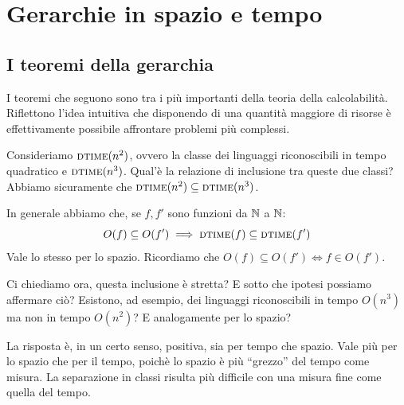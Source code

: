 %
%
%
%
\chapter{Gerarchie in spazio e tempo}


\section{I teoremi della gerarchia}

I teoremi che seguono sono tra i più importanti della teoria della calcolabilità. Riflettono
l'idea intuitiva che disponendo di una quantità maggiore di risorse è effettivamente possibile
affrontare problemi più complessi.

Consideriamo $\textsc{dtime}(n^{2})$, ovvero la classe dei linguaggi riconoscibili in tempo quadratico e
$\textsc{dtime}(n^{3})$. Qual'è la relazione di inclusione tra queste due classi? Abbiamo sicuramente che
$\textsc{dtime}(n^{2}) \subseteq \textsc{dtime}(n^{3})$.

In generale abbiamo che, se $f,f'$ sono funzioni da $\mathbb{N}$ a $\mathbb{N}$:
\begin{equation*}
    O(f) \subseteq O(f') \implies \textsc{dtime}(f) \subseteq \textsc{dtime}(f')
\end{equation*}
Vale lo stesso per lo spazio. Ricordiamo che $O(f) \subseteq O(f') \iff f \in O(f')$.

Ci chiediamo ora, questa inclusione è stretta? E sotto che ipotesi possiamo affermare ciò?
Esistono, ad esempio, dei linguaggi riconoscibili in tempo $O(n^{3})$ ma non in tempo $O(n^{2})$? E
analogamente per lo spazio?

La risposta è, in un certo senso, positiva, sia per tempo che spazio. Vale più per lo spazio che
per il tempo, poichè lo spazio è più ``grezzo'' del tempo come misura. La separazione in classi
risulta più difficile con una misura fine come quella del tempo.


